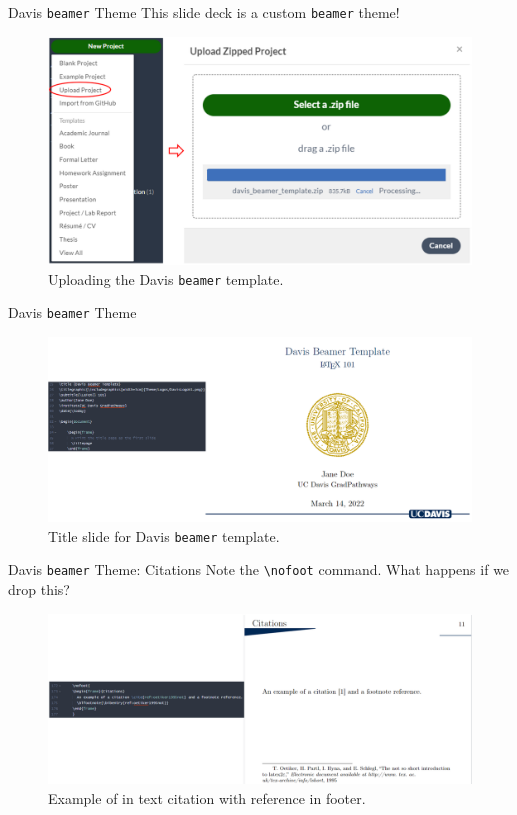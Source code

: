 \documentclass{beamer}
\begin{document}
{  \begin{frame}{Davis \texttt{beamer} Theme}
    This slide deck is a custom \texttt{beamer} theme!
    \begin{figure}
      \includegraphics[width=0.9\linewidth]{day03-07A-davisupload.png}
      \caption{Uploading the Davis \texttt{beamer} template.}
      \label{fig:day03-07A-davisupload}
    \end{figure}
  \end{frame}

  \begin{frame}{Davis \texttt{beamer} Theme}
    \begin{figure}
      \includegraphics[width=\linewidth]{day03-07B-davistitle.png}
      \caption{Title slide for Davis \texttt{beamer} template.}
      \label{fig:day03-07B-davistitle}
    \end{figure}
  \end{frame}

  \begin{frame}{Davis \texttt{beamer} Theme: Citations}
    Note the \texttt{\textbackslash nofoot} command. What happens if we drop this?
    \begin{figure}
      \includegraphics[width=\linewidth]{day03-07C-davisfootcite.png}
      \caption{Example of in text citation with reference in footer.}
      \label{fig:day03-07C-davisfootcite}
    \end{figure}
  \end{frame}

}
\end{document}
